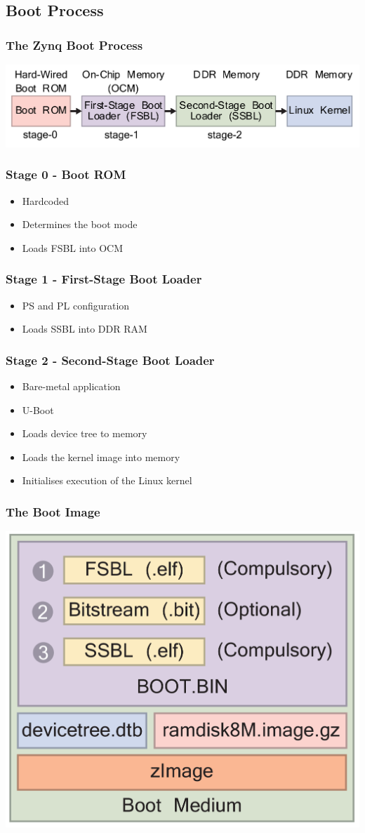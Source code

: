 \documentclass[mathserif]{beamer}
\begin{document}
\begin{frame}
	\section{Boot Process}
	\frametitle{The Zynq Boot Process}
	\centering
	\includegraphics[width=\linewidth]{graphics/zynq_boot_process}
\end{frame}

\begin{frame}
	\frametitle{Stage 0 - Boot ROM}
	\centering
	\begin{itemize}
		\item Hardcoded
		\item Determines the boot mode
		\item Loads FSBL into OCM
	\end{itemize}
\end{frame}

\begin{frame}
	\frametitle{Stage 1 - First-Stage Boot Loader}
	\centering
	\begin{itemize}
		\item PS and PL configuration
		\item Loads SSBL into DDR RAM
	\end{itemize}
\end{frame}

\begin{frame}
	\frametitle{Stage 2 - Second-Stage Boot Loader}
	\centering
	\begin{itemize}
		\item Bare-metal application
		\item U-Boot
		\item Loads device tree to memory
		\item Loads the kernel image into memory
		\item Initialises execution of the Linux kernel
	\end{itemize}
\end{frame}

\begin{frame}
	\frametitle{The Boot Image}
	\centering
	\includegraphics[width=.65\linewidth]{graphics/boot_image}
\end{frame}
\end{document}
